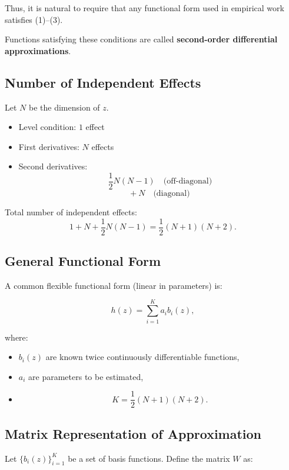 Thus, it is natural to require that any functional form used in empirical
work satisfies (1)--(3).

Functions satisfying these conditions are called
\textbf{second-order differential approximations}.

\subsection*{Number of Independent Effects}

Let $N$ be the dimension of $z$.

\begin{itemize}
    \item Level condition: $1$ effect
    \item First derivatives: $N$ effects
    \item Second derivatives:
    \[
    \frac{1}{2}N(N-1) \quad \text{(off-diagonal)}
    \]
    \[
    +\ N \quad \text{(diagonal)}
    \]
\end{itemize}

Total number of independent effects:
\[
1 + N + \frac{1}{2}N(N-1)
=
\frac{1}{2}(N+1)(N+2).
\]

\subsection*{General Functional Form}

A common flexible functional form (linear in parameters) is:

\[
h(z)
=
\sum_{i=1}^{K} a_i b_i(z),
\]

where:
\begin{itemize}
    \item $b_i(z)$ are known twice continuously differentiable functions,
    \item $a_i$ are parameters to be estimated,
    \item
    \[
    K = \frac{1}{2}(N+1)(N+2).
    \]
\end{itemize}



\subsection*{Matrix Representation of Approximation}

Let $\{b_i(z)\}_{i=1}^K$ be a set of basis functions.
Define the matrix $W$ as:

